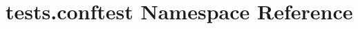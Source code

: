 \hypertarget{namespacetests_1_1conftest}{}\section{tests.\+conftest Namespace Reference}
\label{namespacetests_1_1conftest}
